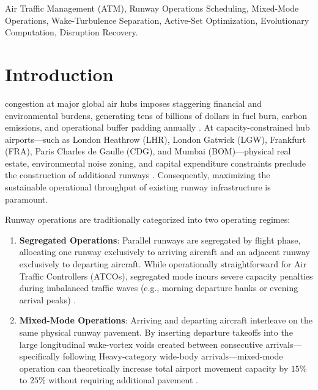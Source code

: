 \documentclass[10pt,journal,compsoc]{IEEEtran}
\begin{document}
{\begin{abstract}
service-level agreement by over $750\times$. These findings demonstrate that machine-level invariant preservation and active-set relaxation provide a mathematically certified foundation for autonomous runway orchestration.
\end{abstract}

\begin{IEEEkeywords}
Air Traffic Management (ATM), Runway Operations Scheduling, Mixed-Mode Operations, Wake-Turbulence Separation, Active-Set Optimization, Evolutionary Computation, Disruption Recovery.
\end{IEEEkeywords}}

\maketitle
\IEEEdisplaynontitleabstractindextext
\IEEEpeerreviewmaketitle

\section{Introduction}
 congestion at major global air hubs imposes staggering financial and environmental burdens, generating tens of billions of dollars in fuel burn, carbon emissions, and operational buffer padding annually \cite{bennell2011,ikli2021}. At capacity-constrained hub airports—such as London Heathrow (LHR), London Gatwick (LGW), Frankfurt (FRA), Paris Charles de Gaulle (CDG), and Mumbai (BOM)—physical real estate, environmental noise zoning, and capital expenditure constraints preclude the construction of additional runways \cite{bennell2017}. Consequently, maximizing the sustainable operational throughput of existing runway infrastructure is paramount.

Runway operations are traditionally categorized into two operating regimes:
\begin{enumerate}
    \item \textbf{Segregated Operations}: Parallel runways are segregated by flight phase, allocating one runway exclusively to arriving aircraft and an adjacent runway exclusively to departing aircraft. While operationally straightforward for Air Traffic Controllers (ATCOs), segregated mode incurs severe capacity penalties during imbalanced traffic waves (e.g., morning departure banks or evening arrival peaks) \cite{faye2018}.
    \item \textbf{Mixed-Mode Operations}: Arriving and departing aircraft interleave on the same physical runway pavement. By inserting departure takeoffs into the large longitudinal wake-vortex voids created between consecutive arrivals—specifically following Heavy-category wide-body arrivals—mixed-mode operation can theoretically increase total airport movement capacity by $15\%$ to $25\%$ without requiring additional pavement \cite{furini2015,solveling2014}.
\end{enumerate}
\end{document}
